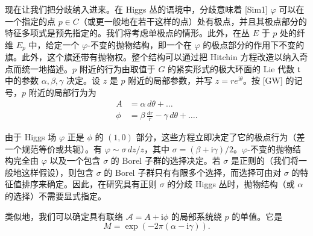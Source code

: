 \documentclass[11pt,a4paper]{article}
\newcommand{\ii}{\mathrm{i}}
\begin{document}
现在让我们把分歧纳入进来。在 Higgs 丛的语境中，分歧意味着 [Sim1] $\varphi$ 可以在一个指定的点 $p\in C$（或更一般地在若干这样的点）处有极点，并且其极点部分的特征多项式是预先指定的。我们将考虑单极点的情形。此外，在丛 $E$ 于 $p$ 处的纤维 $E_p$ 中，给定一个 $\varphi$-不变的抛物结构，即一个在 $\varphi$ 的极点部分的作用下不变的旗。此外，这个旗还带有抛物权。整个结构可以通过把 Hitchin 方程改造以纳入奇点而统一地描述。$p$ 附近的行为由取值于 $G$ 的紧实形式的极大环面的 Lie 代数 $\mathfrak{t}$ 中的参数 $\alpha,\beta,\gamma$ 决定。设 $z$ 是 $p$ 附近的局部参数，并写 $z=re^{\ii\theta}$。按 [GW] 的记号，$p$ 附近的局部行为为
\begin{equation}\tag{3.4}
\begin{aligned}
A &= \alpha\, d\theta + \ldots\\
\phi &= \beta\,\frac{dr}{r} - \gamma\, d\theta + \ldots .
\end{aligned}
\end{equation}

由于 Higgs 场 $\varphi$ 正是 $\phi$ 的 $(1,0)$ 部分，这些方程立即决定了它的极点行为（差一个规范等价或共轭）。有 $\varphi\sim\sigma\, dz/z$，其中 $\sigma=(\beta+\ii\gamma)/2$。$\varphi$-不变的抛物结构完全由 $\varphi$ 以及一个包含 $\sigma$ 的 Borel 子群的选择决定。若 $\sigma$ 是正则的（我们将一般地这样假设），则包含 $\sigma$ 的 Borel 子群只有有限多个选择，而选择可由对 $\sigma$ 的特征值排序来确定。因此，在研究具有正则 $\sigma$ 的分歧 Higgs 丛时，抛物结构（或 $\alpha$ 的选择）不需要显式指定。

类似地，我们可以确定具有联络 $\mathcal{A}=A+\ii\phi$ 的局部系统绕 $p$ 的单值。它是
\begin{equation}\tag{3.5}
M=\exp(-2\pi(\alpha-\ii\gamma)).
\end{equation}
\end{document}
